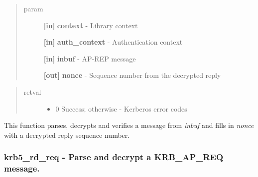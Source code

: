 \documentclass[letterpaper,10pt,english]{sphinxmanual}
\begin{document}
\begin{quote}\begin{description}
\item[{param}] \leavevmode
\textbf{{[}in{]}} \textbf{context} - Library context

\textbf{{[}in{]}} \textbf{auth\_context} - Authentication context

\textbf{{[}in{]}} \textbf{inbuf} - AP-REP message

\textbf{{[}out{]}} \textbf{nonce} - Sequence number from the decrypted reply

\end{description}\end{quote}
\begin{quote}\begin{description}
\item[{retval}] \leavevmode\begin{itemize}
\item {} 
0   Success; otherwise - Kerberos error codes

\end{itemize}

\end{description}\end{quote}

This function parses, decrypts and verifies a message from \emph{inbuf} and fills in \emph{nonce} with a decrypted reply sequence number.


\subsubsection{krb5\_rd\_req -  Parse and decrypt a KRB\_AP\_REQ message.}
\label{appdev/refs/api/krb5_rd_req::doc}\label{appdev/refs/api/krb5_rd_req:krb5-rd-req-parse-and-decrypt-a-krb-ap-req-message}

\begin{fulllineitems}
\label{appdev/refs/api/krb5_rd_req:krb5_rd_req}
\end{fulllineitems}
\end{document}
